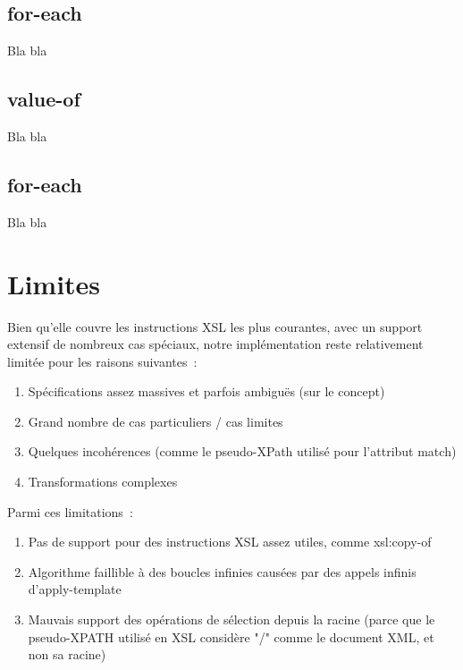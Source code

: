     \subsection{for-each}
        Bla bla

    \subsection{value-of}
        Bla bla

    \subsection{for-each}
        Bla bla

\section{Limites}

Bien qu'elle couvre les instructions XSL les plus courantes, avec un support extensif de nombreux cas spéciaux,
notre implémentation reste relativement limitée pour les raisons suivantes~:

\begin{enumerate}
    \item Spécifications assez massives et parfois ambiguës (sur le concept)
    \item Grand nombre de cas particuliers / cas limites
    \item Quelques incohérences (comme le pseudo-XPath utilisé pour l'attribut match)
    \item Transformations complexes
\end{enumerate}

Parmi ces limitations~:

\begin{enumerate}
    \item Pas de support pour des instructions XSL assez utiles, comme xsl:copy-of
    \item Algorithme faillible à des boucles infinies causées par des appels infinis d'apply-template
    \item Mauvais support des opérations de sélection depuis la racine (parce que le pseudo-XPATH utilisé en XSL considère "/" comme le document XML, et non sa racine)
\end{enumerate}